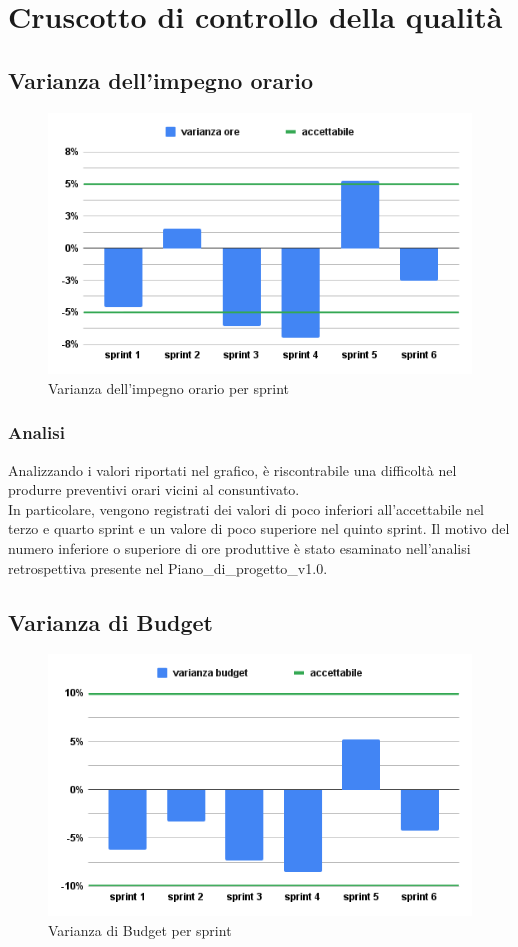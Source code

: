 \chapter{Cruscotto di controllo della qualità} \label{sec:cruscotto}

\section{Varianza dell'impegno orario}
\begin{figure}[H]
    \centering
    \includegraphics[width=0.8\linewidth]{VarOre.png}
    \caption{Varianza dell'impegno orario per sprint}
\end{figure}
\subsection{Analisi}
Analizzando i valori riportati nel grafico, è riscontrabile una difficoltà nel produrre preventivi orari vicini al consuntivato.\\
In particolare, vengono registrati dei valori di poco inferiori all'accettabile nel terzo e quarto sprint e un valore di poco superiore nel quinto sprint. Il motivo del numero inferiore o superiore di ore produttive è stato esaminato nell'analisi retrospettiva presente nel Piano\_di\_progetto\_v1.0.

\section{Varianza di Budget}
\begin{figure}[H]
    \centering
    \includegraphics[width=0.8\linewidth]{VarBud.png}
    \caption{Varianza di Budget per sprint}
\end{figure}
